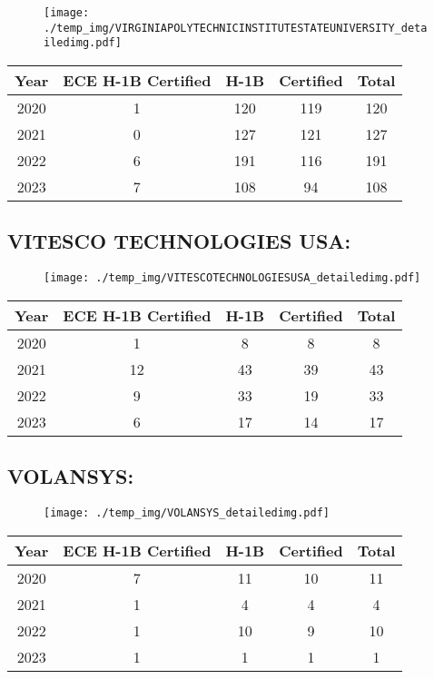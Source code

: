 \documentclass{article}%
\begin{document}
\begin{figure}[htbp]%
\centering%
\texttt{[image: ./temp\_img/VIRGINIAPOLYTECHNICINSTITUTESTATEUNIVERSITY\_detailedimg.pdf]}%
\end{figure}

%
\begin{longtable}{c|c|c|c|c}%
\hline%
Year&ECE H{-}1B Certified&H{-}1B&Certified&Total\\%
\hline%
2020&1&120&119&120\\%
\hline%
2021&0&127&121&127\\%
\hline%
2022&6&191&116&191\\%
\hline%
2023&7&108&94&108\\%
\hline%
\end{longtable}

%
\newpage%
\subsection{VITESCO TECHNOLOGIES USA:}%
\label{subsec:VITESCOTECHNOLOGIESUSA}%
\label{VITESCOTECHNOLOGIESUSAdetailed}%


\begin{figure}[htbp]%
\centering%
\texttt{[image: ./temp\_img/VITESCOTECHNOLOGIESUSA\_detailedimg.pdf]}%
\end{figure}

%
\begin{longtable}{c|c|c|c|c}%
\hline%
Year&ECE H{-}1B Certified&H{-}1B&Certified&Total\\%
\hline%
2020&1&8&8&8\\%
\hline%
2021&12&43&39&43\\%
\hline%
2022&9&33&19&33\\%
\hline%
2023&6&17&14&17\\%
\hline%
\end{longtable}

%
\newpage%
\subsection{VOLANSYS:}%
\label{subsec:VOLANSYS}%
\label{VOLANSYSdetailed}%


\begin{figure}[htbp]%
\centering%
\texttt{[image: ./temp\_img/VOLANSYS\_detailedimg.pdf]}%
\end{figure}

%
\begin{longtable}{c|c|c|c|c}%
\hline%
Year&ECE H{-}1B Certified&H{-}1B&Certified&Total\\%
\hline%
2020&7&11&10&11\\%
\hline%
2021&1&4&4&4\\%
\hline%
2022&1&10&9&10\\%
\hline%
2023&1&1&1&1\\%
\hline%
\end{longtable}
\end{document}
